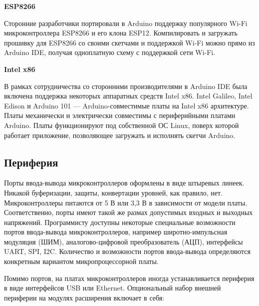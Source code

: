 \documentclass[12pt, oneside]{altsu-report}
\begin{document}
\begin{center}
    \textbf{ESP8266}
\end{center}

Сторонние разработчики портировали в Arduino поддержку популярного Wi-Fi микроконтроллера ESP8266 и его клона ESP12. Компилировать и загружать прошивку для ESP8266 со своими скетчами и поддержкой Wi-Fi можно прямо из Arduino IDE, получая одноплатную схему с поддержкой сети Wi-Fi.

\begin{center}
    \textbf{Intel x86}
\end{center}

В рамках сотрудничества со сторонними производителями в Arduino IDE была включена поддержка некоторых аппаратных средств Intel x86. Intel Galileo, Intel Edison и Arduino 101 --- Arduino-совместимые платы на Intel x86 архитектуре. Платы механически и электрически совместимы с периферийными платами Arduino. Платы функционируют под собственной ОС Linux, поверх которой работает приложение, позволяющее загружать и исполнять скетчи Arduino.

\subsection{Периферия}

Порты ввода-вывода микроконтроллеров оформлены в виде штыревых линеек. Никакой буферизации, защиты, конвертации уровней, как правило, нет. Микроконтроллеры питаются от 5 В или 3,3 В в зависимости от модели платы. Соответственно, порты имеют такой же размах допустимых входных и выходных напряжений. Программисту доступны некоторые специальные возможности портов ввода-вывода микроконтроллеров, например широтно-импульсная модуляция (ШИМ), аналогово-цифровой преобразователь (АЦП), интерфейсы UART, SPI, I2C. Количество и возможности портов ввода-вывода определяются конкретным вариантом микропроцессорной платы.

Помимо портов, на платах микроконтроллеров иногда устанавливается периферия в виде интерфейсов USB или Ethernet. Опциональный набор внешней периферии на модулях расширения включает в себя:
\end{document}
